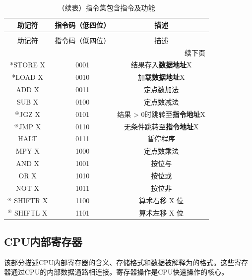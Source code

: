 \documentclass[lang=cn,a4paper,newtx]{elegantpaper}
\begin{document}
\begin{longtable}{c c c}
  \caption{指令集包含指令及功能} \label{tab:ISA:instructions} \\
  \toprule
  助记符  & 指令码（低四位） & 描述 \\
  \midrule
  \endfirsthead
  
  \caption[]{（续表）指令集包含指令及功能} \\
  \toprule
  助记符  & 指令码（低四位） & 描述 \\
  \midrule
  \endhead
  
  \midrule
  \multicolumn{3}{r}{续下页} \\
  \midrule
  \endfoot
  
  \bottomrule
  \endlastfoot
  
  *STORE X &  0001   & 结果存入\textbf{数据地址}X \\
  *LOAD X  & 0010    & 加载\textbf{数据地址}X \\
  ADD X   & 0011    & 定点数加法\\
  SUB X   & 0100  & 定点数减法\\
  $^\circledast$JGZ X   & 0101    & 结果 > 0时跳转至\textbf{指令地址}X\\
  $^\circledast$JMP X   & 0110    & 无条件跳转至\textbf{指令地址}X\\
  HALT    & 0111    & 暂停程序\\
  MPY X   & 1000    & 定点数乘法 \\
  AND X   & 1001    & 按位与\\
  OR X    & 1010    & 按位或\\
  NOT X   & 1011    & 按位非 \\
  $^\circledast$ SHIFTR X & 1100    & 算术右移 X 位\\
  $^\circledast$ SHIFTL X & 1101    & 算术左移 X 位\\
\end{longtable}

\subsection{CPU内部寄存器}
该部分描述CPU内部寄存器的含义、存储格式和数据被解释为的格式。这些寄存器通过CPU的内部数据通路相连接。寄存器操作是CPU快速操作的核心。
\end{document}
